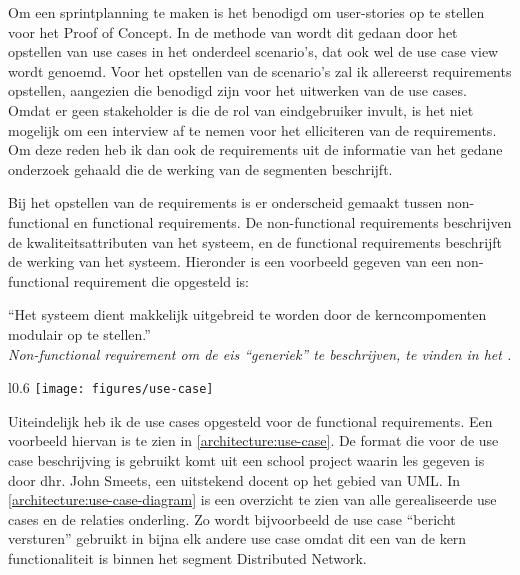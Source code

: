 Om een sprintplanning te maken is het benodigd om user-stories op te stellen voor het Proof of Concept. In de methode van \cite{kruchten19954+} wordt dit gedaan door het opstellen van use cases in het onderdeel scenario's, dat ook wel de use case view wordt genoemd. Voor het opstellen van de scenario's zal ik allereerst requirements opstellen, aangezien die benodigd zijn voor het uitwerken van de use cases. Omdat er geen stakeholder is die de rol van eindgebruiker invult, is het niet mogelijk om een interview af te nemen voor het elliciteren van de requirements. Om deze reden heb ik dan ook de requirements uit de informatie van het gedane onderzoek gehaald die de werking van de segmenten beschrijft.

Bij het opstellen van de requirements is er onderscheid gemaakt tussen non-functional en functional requirements. De non-functional requirements beschrijven de kwaliteitsattributen van het systeem, en de functional requirements beschrijft de werking van het systeem. Hieronder is een voorbeeld gegeven van een non-functional requirement die opgesteld is: \\

\begin{formal}
    ``Het systeem dient makkelijk uitgebreid te worden door de kerncompomenten modulair op te stellen.''
    \\ \textit{Non-functional requirement om de eis ``generiek'' te beschrijven, te vinden in het .}
\end{formal}

\begin{wrapfigure}{l}{0.6\textwidth}
    \texttt{[image: figures/use-case]}
    \caption[Voorbeeld use-case: Connectie leggen deelnemer]{Voorbeeld van een opgestelde use-case zoals te vinden in het .}
    \label{architecture:use-case}
\end{wrapfigure}  

Uiteindelijk heb ik de use cases opgesteld voor de functional requirements. Een voorbeeld hiervan is te zien in \ref{architecture:use-case}. De format die voor de use case beschrijving is gebruikt komt uit een school project waarin les gegeven is door dhr. John Smeets, een uitstekend docent op het gebied van UML. In \ref{architecture:use-case-diagram} is een overzicht te zien van alle gerealiseerde use cases en de relaties onderling. Zo wordt bijvoorbeeld de use case ``bericht versturen'' gebruikt in bijna elk andere use case omdat dit een van de kern functionaliteit is binnen het segment Distributed Network.


